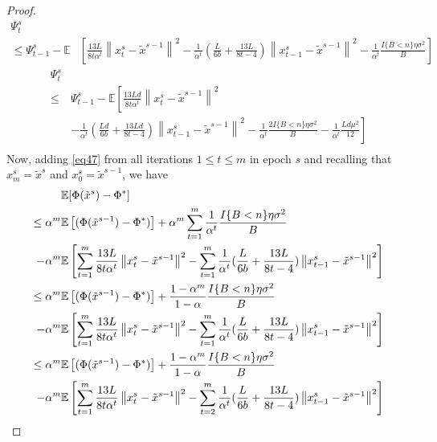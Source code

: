 \documentclass{article}
\newcommand*{\E}{\mathbb{E}}
\newcommand{\norm}[1]{\left\lVert#1\right\rVert}
\theoremstyle{definition}
\theoremstyle{remark}
\begin{document}
\begin{proof}
\begin{equation}\label{eq47}
\begin{split}
\Psi_t^s&\\
\leq\Psi_{t-1}^s-\E&\left[\frac{13L}{8t\alpha^t}\norm{{x}_t^s-\tilde{x}^{s-1}}^2-\frac{1}{\alpha^t}(\frac{L}{6b}+\frac{13L}{8t-4}) \norm{x_{t-1}^s-\tilde{x}^{s-1}}^2 - \frac{1}{\alpha^t}\frac{I\{B < n\}\eta \sigma ^2}{B}\right]
\end{split}
\end{equation}
{\color{blue}
\begin{equation}\label{eq47}
\begin{split}
\Psi_t^s
\\  
\leq& \Psi_{t-1}^s - \E\left[\frac{13L d}{8t\alpha^t}\norm{{x}_t^s-\tilde{x}^{s-1}}^2\right.\\
&\left.-\frac{1}{\alpha^t}(\frac{L d}{6b}+\frac{13Ld}{8t-4}) \norm{x_{t-1}^s-\tilde{x}^{s-1}}^2 - \frac{1}{\alpha^t}\frac{2I\{B < n\}\eta \sigma ^2}{B}- \frac{1}{\alpha^t}\frac{L d \mu^2}{12}\right]\\
\end{split}
\end{equation}
}
Now, adding \eqref{eq47} from all iterations $1\leq t \leq m$ in epoch $s$ and recalling that $x_m^s = \tilde{x}^s$ and $x_0^s = \tilde{x}^{s-1}$, we have 
\begin{align}
\E&[\Phi(\tilde{x}^s)-\Phi^*]\notag\\
\leq\alpha^m\E&\left[(\Phi(\tilde{x}^{s-1}) - \Phi^*)\right] +\alpha^m\sum_{t=1}^m \frac{1}{\alpha^t}\frac{I\{B < n\}\eta \sigma ^2}{B}\notag
\\-\alpha^m\E&\left[\sum_{t=1}^m\frac{13L}{8t\alpha^t}\norm{{x}_t^s-\tilde{x}^{s-1}}^2-\sum_{t=1}^m\frac{1}{\alpha^t}(\frac{L}{6b}+\frac{13L}{8t-4}) \norm{x_{t-1}^s-\tilde{x}^{s-1}}^2 \right]\notag\\
\leq\alpha^m\E&\left[(\Phi(\tilde{x}^{s-1}) - \Phi^*)\right] + \frac{1-\alpha^m}{1-\alpha}\frac{I\{B < n\}\eta \sigma ^2}{B}\notag
\\-\alpha^m\E&\left[\sum_{t=1}^m\frac{13L}{8t\alpha^t}\norm{{x}_t^s-\tilde{x}^{s-1}}^2-\sum_{t=1}^m\frac{1}{\alpha^t}(\frac{L}{6b}+\frac{13L}{8t-4}) \norm{x_{t-1}^s-\tilde{x}^{s-1}}^2 \right]\notag\\
\leq\alpha^m\E&\left[(\Phi(\tilde{x}^{s-1}) - \Phi^*)\right] + \frac{1-\alpha^m}{1-\alpha}\frac{I\{B < n\}\eta \sigma ^2}{B}\notag
\\-\alpha^m\E&\left[\sum_{t=1}^m\frac{13L}{8t\alpha^t}\norm{{x}_t^s-\tilde{x}^{s-1}}^2-\sum_{t=2}^m\frac{1}{\alpha^t}(\frac{L}{6b}+\frac{13L}{8t-4}) \norm{x_{t-1}^s-\tilde{x}^{s-1}}^2 \right]\label{eq48}\\

\end{align}
\end{proof}
\end{document}
